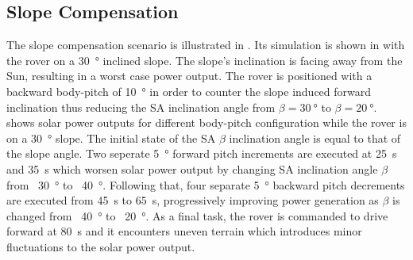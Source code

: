 \subsection{Slope Compensation}

The slope compensation scenario is illustrated in . Its simulation is shown in  with the rover on a \SI{30}{\degree} inclined slope. The slope's inclination is facing away from the Sun, resulting in a worst case power output. The rover is positioned with a backward body-pitch of \SI{10}{\degree} in order to counter the slope induced forward inclination thus reducing the \ac{SA} inclination angle from $\beta=\SI{30}{\degree}$ to $\beta=\SI{20}{\degree}$.  shows solar power outputs for different body-pitch configuration while the rover is on a \SI{30}{\degree} slope. The initial state of the \ac{SA} $\beta$ inclination angle is equal to that of the slope angle. Two seperate \SI{5}{\degree} forward pitch increments are executed at \SI{25}{\second} and \SI{35}{\second} which worsen solar power output by changing \ac{SA} inclination angle $\beta$ from ~\SI{30}{\degree} to ~\SI{40}{\degree}. Following that, four separate \SI{5}{\degree} backward pitch decrements are executed from \SI{45}{\second} to \SI{65}{\second}, progressively improving power generation as $\beta$ is changed from ~\SI{40}{\degree} to ~\SI{20}{\degree}. As a final task, the rover is commanded to drive forward at \SI{80}{\second} and it encounters uneven terrain which introduces minor fluctuations to the solar power output.

